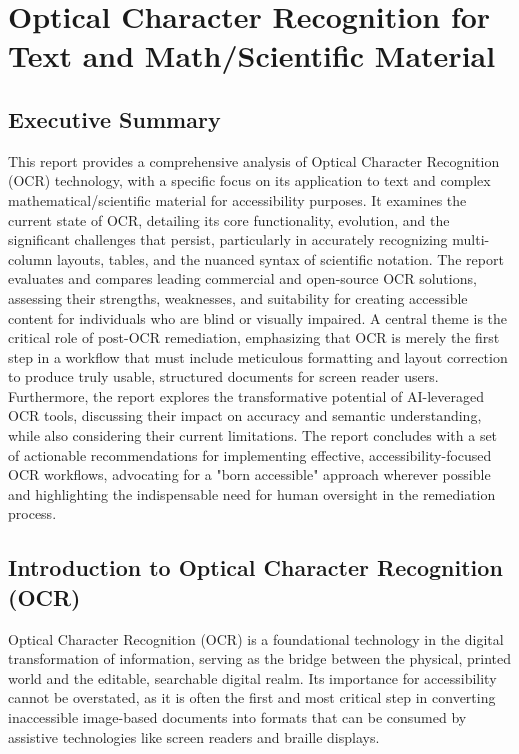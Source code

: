\chapter{Optical Character Recognition for Text and Math/Scientific Material}
\label{chap:ocr-report}


\section{Executive Summary}
\label{sec:ocr-executive-summary}
This report provides a comprehensive analysis of Optical Character Recognition (OCR) technology, with a specific focus on its application to text and complex mathematical/scientific material for accessibility purposes. It examines the current state of OCR, detailing its core functionality, evolution, and the significant challenges that persist, particularly in accurately recognizing multi-column layouts, tables, and the nuanced syntax of scientific notation. The report evaluates and compares leading commercial and open-source OCR solutions, assessing their strengths, weaknesses, and suitability for creating accessible content for individuals who are blind or visually impaired. A central theme is the critical role of post-OCR remediation, emphasizing that OCR is merely the first step in a workflow that must include meticulous formatting and layout correction to produce truly usable, structured documents for screen reader users. Furthermore, the report explores the transformative potential of AI-leveraged OCR tools, discussing their impact on accuracy and semantic understanding, while also considering their current limitations. The report concludes with a set of actionable recommendations for implementing effective, accessibility-focused OCR workflows, advocating for a "born accessible" approach wherever possible and highlighting the indispensable need for human oversight in the remediation process.

\section{Introduction to Optical Character Recognition (OCR)}
\label{sec:intro-to-ocr}
Optical Character Recognition (OCR) is a foundational technology in the digital transformation of information, serving as the bridge between the physical, printed world and the editable, searchable digital realm. Its importance for accessibility cannot be overstated, as it is often the first and most critical step in converting inaccessible image-based documents into formats that can be consumed by assistive technologies like screen readers and braille displays.

